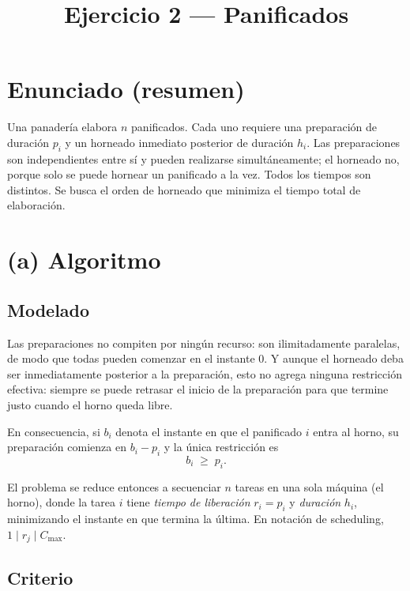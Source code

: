 \documentclass[11pt,a4paper]{article}
\title{Ejercicio 2 --- Panificados}
\author{}
\date{}
\theoremstyle{plain}
\theoremstyle{definition}
\theoremstyle{remark}
\begin{document}
\maketitle
\vspace{-2.5em}

\section*{Enunciado (resumen)}

Una panadería elabora $n$ panificados. Cada uno requiere una preparación de
duración $p_i$ y un horneado inmediato posterior de duración $h_i$. Las
preparaciones son independientes entre sí y pueden realizarse simultáneamente;
el horneado no, porque solo se puede hornear un panificado a la vez. Todos los
tiempos son distintos. Se busca el orden de horneado que minimiza el tiempo
total de elaboración.

\section*{(a) Algoritmo}

\subsection*{Modelado}

Las preparaciones no compiten por ningún recurso: son ilimitadamente paralelas,
de modo que todas pueden comenzar en el instante $0$. Y aunque el horneado deba
ser inmediatamente posterior a la preparación, esto no agrega ninguna
restricción efectiva: siempre se puede retrasar el inicio de la preparación
para que termine justo cuando el horno queda libre.

En consecuencia, si $b_i$ denota el instante en que el panificado $i$ entra al
horno, su preparación comienza en $b_i - p_i$ y la única restricción es
\[
  b_i \;\geq\; p_i .
\]

El problema se reduce entonces a secuenciar $n$ tareas en una sola máquina (el
horno), donde la tarea $i$ tiene \emph{tiempo de liberación} $r_i = p_i$ y
\emph{duración} $h_i$, minimizando el instante en que termina la última. En
notación de scheduling, $1 \mid r_j \mid C_{\max}$.

\subsection*{Criterio}
\end{document}
